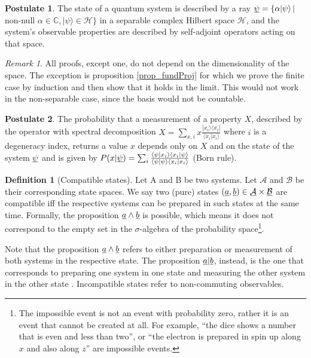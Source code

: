 \documentclass[aps,prl,amsmath,amssymb,twocolumn,nofootinbib]{revtex4}
\theoremstyle{plain}
\theoremstyle{definition}
\newtheorem{defn}[thrm]{Definition}
\newtheorem{post}{Postulate}[]
\theoremstyle{remark}
\newtheorem*{remark}{Remark}
\newcommand{\pj}[1] {\underbar{$#1$}}
\def\>{\rangle}
\def\<{\langle}
\begin{document}
	
	\begin{post}\label{post_state}
		The state of a quantum system is described by a ray $\pj{\psi} = \{
		\alpha |\psi\> \, |$ non-null $\alpha \in
		\mathbb{C},|\psi\>\in\mathcal{H}\}$ in a separable complex Hilbert space
		$\mathcal{H}$, and the system's observable properties are described
		by self-adjoint operators acting on that space. %
	\end{post}
	
	\begin{remark}
		All proofs, except one, do not depend on the dimensionality of
		the space. The exception is proposition \ref{prop_fundProj} for which we prove the finite case by induction and then show that it holds in the limit. This would not work in the non-separable case, since the basis would not be countable.
	\end{remark}
	
	\begin{post}\label{post_measurements}
		The probability that a measurement of a property $X$, described by the operator with
		spectral decomposition $X = \sum_{x,i }x \frac{| x_i \> \< x_i |}{\< x_i | x_i \>}$  where $i$ is a degeneracy index, returns a value $x$ depends only on $X$ and on the state of the system $\pj{\psi}$ and is given by $P(x|\pj{\psi})=\sum_i \frac{\<\psi| x_i \> \< x_i |\psi\>}{\< \psi | \psi \>\< x_i | x_i \>}$
		(Born rule).\end{post}
	
	
	\begin{defn}[Compatible states]\label{def_compatible}
		Let A and B be two systems. Let ${\mathcal{A}}$ and ${\mathcal{B}}$
		be their corresponding state spaces. We say two (pure) states $(\pj{a},
		\pj{b}) \in \pj{\mathcal{A}} \times \pj{\mathcal{B}}$ are compatible
		iff the respective systems can be prepared in such states at the
		same time. Formally, the proposition $\pj{a} \wedge \pj{b}$ is
		possible, which means it does not correspond to the empty set in the
		$\sigma$-algebra of the probability space\footnote{The impossible event is not an event with probability zero, rather it is an event that cannot be created at all. For example, ``the dice shows a number that is even and less than two'', or ``the electron is prepared in spin up along $x$ and also along $z$'' are impossible events.}.
	\end{defn}
	
	{Note that the proposition $\pj{a} \wedge \pj{b}$ refers to either
		preparation or measurement of both systems  in the respective state.
		The proposition $\pj{a} | \pj{b}$, instead, is the one that
		corresponds to preparing one system in one state and measuring the
		other system in the other state \cite{cox}. Incompatible states
		refer to non-commuting observables.}
	
\end{document}
